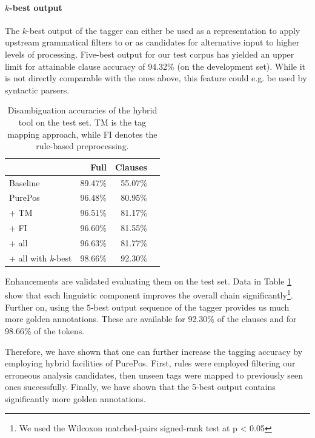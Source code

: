 
\paragraph{$k$-best output}
The $k$-best output of the tagger can either be used as a representation to apply upstream grammatical filters to or as candidates for alternative input to higher levels of processing. 
Five-best output for our test corpus has yielded an upper limit for attainable clause accuracy of 94.32\% (on the development set). 
While it is not directly comparable with the ones above, this feature could e.g. be used by syntactic parsers.


\begin{table}[H]
\centering
\caption{Disambiguation accuracies of the hybrid tool on the test set. TM is the tag mapping approach, while FI denotes the rule-based preprocessing.}
\label{tab:oldhun-test}
\begin{tabular}{l r r r}
\hline
 & Full & Clauses  \\
\hline
Baseline  & 89.47\% & 55.07\% \\
PurePos  & 96.48\% & 80.95\% \\
\hspace{0.2cm} + TM  & 96.51\% & 81.17\% \\
\hspace{0.2cm} + FI  & 96.60\% & 81.55\% \\
\hspace{0.2cm} + all  & 96.63\% & 81.77\% \\
\hspace{0.2cm} + all with \emph{k}-best  & 98.66\% & 92.30\% \\
\hline
\end{tabular}
\end{table}
 
Enhancements are validated evaluating them on the test set.
Data in Table \ref{tab:oldhun-test} show that each linguistic component improves the overall chain significantly\footnote{We used the Wilcoxon matched-pairs signed-rank test at p < 0.05}.
Further on, using the $5$-best output sequence of the tagger provides us much more golden annotations. 
These are available for 92.30\% of the clauses and for 98.66\% of the tokens.

Therefore, we have shown that one can further increase the tagging accuracy by employing hybrid facilities of PurePos. 
First, rules were employed filtering our erroneous analysis candidates, then unseen tags were mapped to previously seen ones successfully. 
Finally, we have shown that the 5-best output contains significantly more golden annotations.



